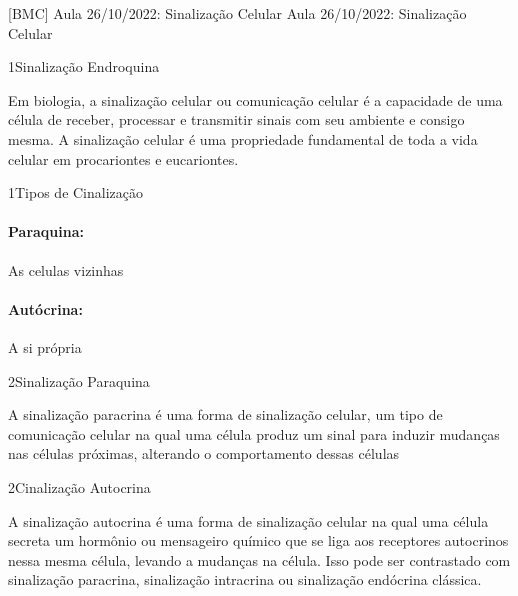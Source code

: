 \documentclass[\mainfilename]{subfiles}
\begin{document}
[BMC]
{Aula 26/10/2022: Sinalização Celular} %
{Aula 26/10/2022: Sinalização Celular} %

\begin{sectionBox}1{Sinalização Endroquina} %
    
    Em biologia, a sinalização celular ou comunicação celular é a capacidade de uma célula de receber, processar e transmitir sinais com seu ambiente e consigo mesma. A sinalização celular é uma propriedade fundamental de toda a vida celular em procariontes e eucariontes.
    
\end{sectionBox}

\begin{sectionBox}1{Tipos de Cinalização} %
    
    \begin{multicols}{2}
        \paragraph*{Paraquina:} As celulas vizinhas
        \paragraph*{Autócrina:} A si própria
    \end{multicols}
    
\end{sectionBox}

\begin{sectionBox}2{Sinalização Paraquina} %
    
    A sinalização paracrina é uma forma de sinalização celular, um tipo de comunicação celular na qual uma célula produz um sinal para induzir mudanças nas células próximas, alterando o comportamento dessas células
    
\end{sectionBox}

\begin{sectionBox}2{Cinalização Autocrina} %
    
    A sinalização autocrina é uma forma de sinalização celular na qual uma célula secreta um hormônio ou mensageiro químico que se liga aos receptores autocrinos nessa mesma célula, levando a mudanças na célula. Isso pode ser contrastado com sinalização paracrina, sinalização intracrina ou sinalização endócrina clássica.
    
\end{sectionBox}
\end{document}
